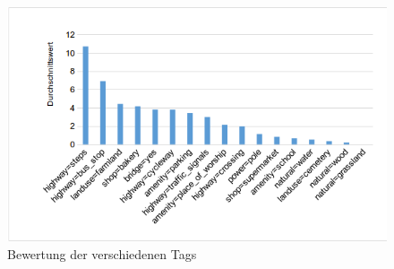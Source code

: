\begin{figure}[H]
\begin{center}
\includegraphics[width=150mm]{images/ch6_img07_result1.png}
\caption{Bewertung der verschiedenen Tags}
\label{img:ch6_img07_result1}
\end{center}
\end{figure}
